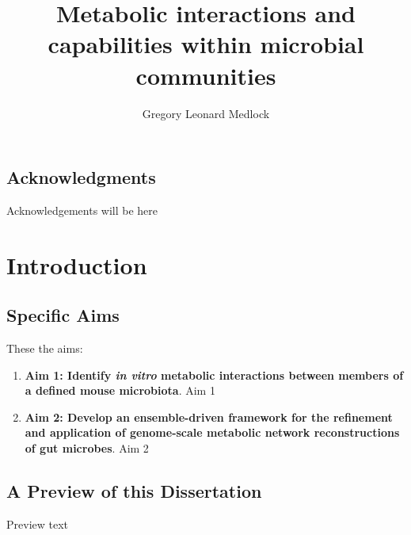 \documentclass[11pt,twocolumn,notitlepage,openany,twoside]{book}
\title{Metabolic interactions and capabilities within microbial communities}
\author{Gregory Leonard Medlock}
\begin{document}
\frontmatter

\begingroup
\let\clearpage

\tableofcontents
\hspace{1.5cm}
\listoffigures
\hspace{1.5cm}
\listoftables

\endgroup

\clearpage
{}
\section*{Acknowledgments}

Acknowledgements will be here

\mainmatter


\chapter{Introduction}

\section{Specific Aims}

These the aims:

\begin{enumerate}
  \item \textbf{Aim 1: Identify \textit{in vitro} metabolic interactions between members of a defined mouse microbiota}. Aim 1
  \item \textbf{Aim 2: Develop an ensemble-driven framework for the refinement and application of genome-scale metabolic network reconstructions of gut microbes}. Aim 2
\end{enumerate}



\section{A Preview of this Dissertation}

Preview text


\end{document}
